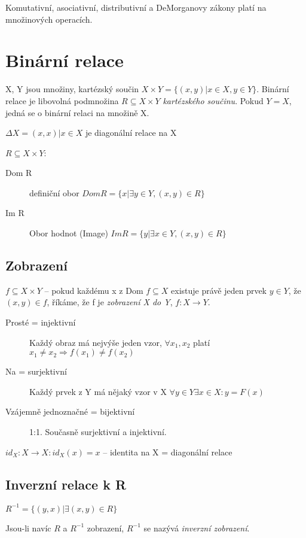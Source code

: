 \documentclass[a4paper, 11pt]{report}
\begin{document}
Komutativní, asociativní, distributivní a DeMorganovy zákony platí na množinových operacích.

\section{Binární relace}

X, Y jsou množiny, kartézský součin $X \times Y = \{(x,y) | x \in X, y \in Y\}$. Binární relace je libovolná podmnožina $R \subseteq X \times Y$ \emph{kartézského součinu}. Pokud $Y = X$, jedná se o binární relaci na množině X.

$\Delta{}X = {(x,x) | x \in X}$ je diagonální relace na X

$R \subseteq X \times Y$:
\begin{description}
	\item[Dom R] definiční obor $Dom R = \{x | \exists y  \in Y, (x,y) \in R\}$
	\item[Im R] Obor hodnot (Image) $Im R = \{y | \exists x  \in Y, (x,y) \in R\}$
\end{description}

\subsection{Zobrazení}
$f \subseteq X \times Y$ -- pokud každému x z Dom $f \subseteq X$ existuje právě jeden prvek $y \in Y$, že $(x,y) \in f$, říkáme, že f je \emph{zobrazení X do Y}, $f: X \to Y$.

\begin{description}
	\item[Prosté = injektivní] Každý obraz má nejvýše jeden vzor, $\forall x_1, x_2$ platí $x_1 \neq x_2 \Rightarrow f(x_1) \neq f(x_2)$ 
	\item[Na = surjektivní] Každý prvek z Y má nějaký vzor v X $\forall y \in Y \exists x \in X: y = F(x)$
	\item[Vzájemně jednoznačné = bijektivní] 1:1. Současně surjektivní a injektivní.
\end{description}

$id_X: X \to X: id_X(x) = x$ -- identita na X = diagonální relace

\subsection{Inverzní relace k R}

$R^{-1} = \{ (y,x) | \exists (x,y) \in R\}$

Jsou-li navíc $R$ a $R^{-1}$ zobrazení, $R^{-1}$ se nazývá \emph{inverzní zobrazení}.
\end{document}
